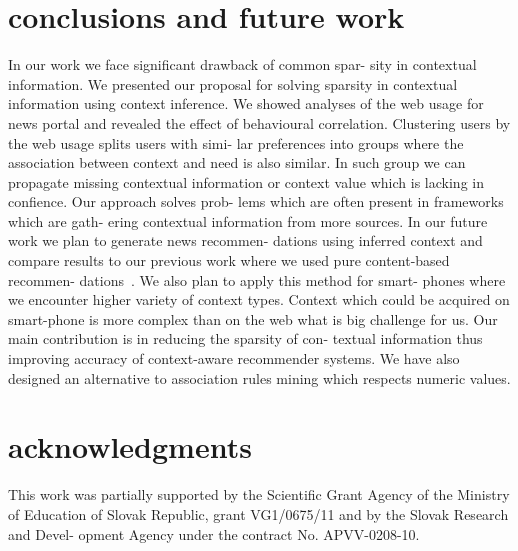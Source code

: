 \documentclass{acm_proc_article-sp} %
\begin{document}
\section{conclusions and future work}

In our work we face significant drawback of common spar-
sity in contextual information. We presented our proposal
for solving sparsity in contextual information using context
inference. We showed analyses of the web usage for news
portal and revealed the effect of behavioural correlation.
Clustering users by the web usage splits users with simi-
lar preferences into groups where the association between
context and need is also similar. In such group we can
propagate missing contextual information or context value
which is lacking in confience. Our approach solves prob-
lems which are often present in frameworks which are gath-
ering contextual information from more sources.
In our future work we plan to generate news recommen-
dations using inferred context and compare results to our
previous work where we used pure content-based recommen-
dations~\cite{zelenik2011news}. We also plan to apply this method for smart-
phones where we encounter higher variety of context types.
Context which could be acquired on smart-phone is more
complex than on the web what is big challenge for us.
Our main contribution is in reducing the sparsity of con-
textual information thus improving accuracy of context-aware
recommender systems. We have also designed an alternative
to association rules mining which respects numeric values.

\section{acknowledgments}

This work was partially supported by the Scientific Grant
Agency of the Ministry of Education of Slovak Republic,
grant VG1/0675/11 and by the Slovak Research and Devel-
opment Agency under the contract No. APVV-0208-10.











\balancecolumns
\end{document}
